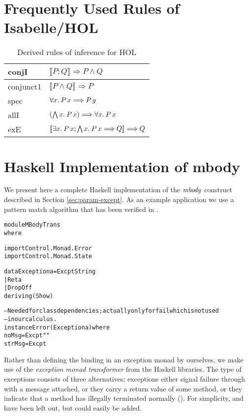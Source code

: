

\chapter{Frequently Used Rules of Isabelle/HOL}
\label{cha:freq-used-rules}

\begin{table}
  \centering \renewcommand{\arraystretch}{1.3}
  \begin{tabular}{|l@{$\quad$}l|}\hline
    conjI       & $\llbracket P; Q\rrbracket \Longrightarrow P \land Q$ \\\hline
    conjunct1   & $\llbracket P \land Q\rrbracket \Longrightarrow P$ \\\hline
    spec        & $\forall x.\: P\, x \Longrightarrow P\, y$\\\hline
    allI        & $(\bigwedge x.\: P\, x) \Longrightarrow \forall x.\: P\, x$\\\hline
    exE         & $\llbracket\exists x.\: P\, x; \bigwedge x.\: P\, x \Longrightarrow Q\rrbracket \Longrightarrow Q$\\\hline
  \end{tabular}
  \caption{Derived rules of inference for HOL}
  \label{tab:derived-rules}
\end{table}



\chapter{Haskell Implementation of mbody }
\label{cha:hask-impl-mbody}

We present here a complete Haskell implementation of the $\mathit{mbody}$ construct
described in Section \ref{sec:param-except}. As an example application we use a
pattern match algorithm that has been verified in \cite{WalterEA05}.
\begin{alltt}
module MBodyTrans
where

import Control.Monad.Error
import Control.Monad.State

data Exception a = Excpt String
                 | Ret a
                 | DropOff
                   deriving (Show)


-- Needed for class dependencies; actually only for fail which is not used
-- in our calculus.
instance Error (Exception a) where
    noMsg = Excpt ""
    strMsg = Excpt
\end{alltt}
Rather than defining the binding in an exception monad by ourselves, we make use
of the \emph{exception monad transformer}  from the Haskell
libraries. The type of exceptions consists of three alternatives; exceptions
either signal failure through  with a message attached, or they
carry a return value of some method, or they indicate that a method has
illegally terminated normally ().  For simplicity, 
and  have been left out, but could easily be added.

